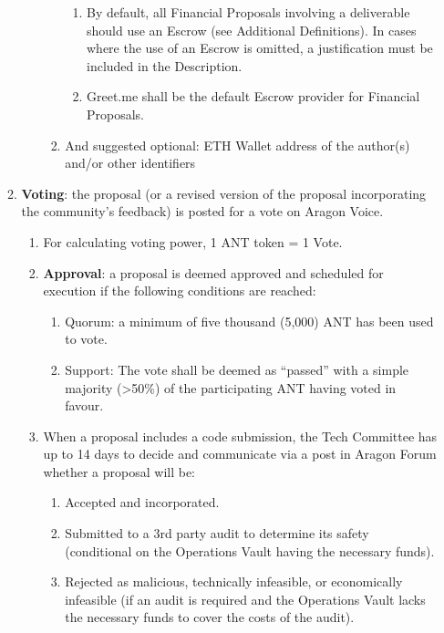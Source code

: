 \begin{enumerate}
\begin{enumerate}
\begin{enumerate}
\begin{enumerate}
				\begin{enumerate}
					\item By default, all Financial Proposals involving a deliverable should use an Escrow (see Additional Definitions).
					In cases where the use of an Escrow is omitted, a justification must be included in the Description.
					\item Greet.me shall be the default Escrow provider for Financial Proposals.
				\end{enumerate}
				\item And suggested optional: ETH Wallet address of the author(s) and/or other identifiers
			\end{enumerate}
		\end{enumerate}
		\item \textbf{Voting}: the proposal (or a revised version of the proposal incorporating the community’s feedback) is posted for a vote on Aragon Voice.
		\begin{enumerate}
			\item For calculating voting power, 1 \ac{ANT} token = 1 Vote.
			\item \textbf{Approval}: a proposal is deemed approved and scheduled for execution if the following conditions are reached:
			\begin{enumerate}
				\item Quorum: a minimum of five thousand (5,000) \ac{ANT} has
				been used to vote.
				\item  Support: The vote shall be deemed as “passed” with a
				simple majority (>50\%) of the participating \ac{ANT} having
				voted in favour.
			\end{enumerate}

			\item When a proposal includes a code submission, the Tech Committee has up to 14 days to decide and communicate via a post in Aragon Forum whether a proposal will be:
			\begin{enumerate}
				\item Accepted and incorporated.
				\item Submitted to a 3rd party audit to determine its safety
				(conditional on the Operations Vault having the necessary
				funds).
				\item Rejected as malicious, technically infeasible, or
				economically infeasible (if an audit is required and the Operations Vault lacks the necessary funds to cover the costs of the audit).
			\end{enumerate}
		\end{enumerate}
	

\end{enumerate}
\end{enumerate}
